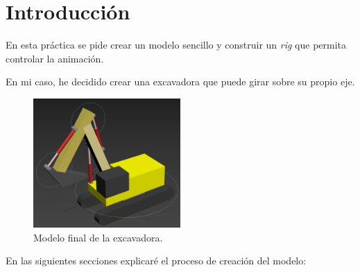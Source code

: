 \section{Introducción}

En esta práctica se pide crear un modelo sencillo y construir un \textit{rig} que permita controlar la animación.

\bigskip

En mi caso, he decidido crear una excavadora que puede girar sobre su propio eje.

\begin{figure}[H]
   \centering
   \includegraphics[width=0.5\textwidth]{imagenes/excavadora.png}
   \caption{Modelo final de la excavadora.}
\end{figure}

En las siguientes secciones explicaré el proceso de creación del modelo: